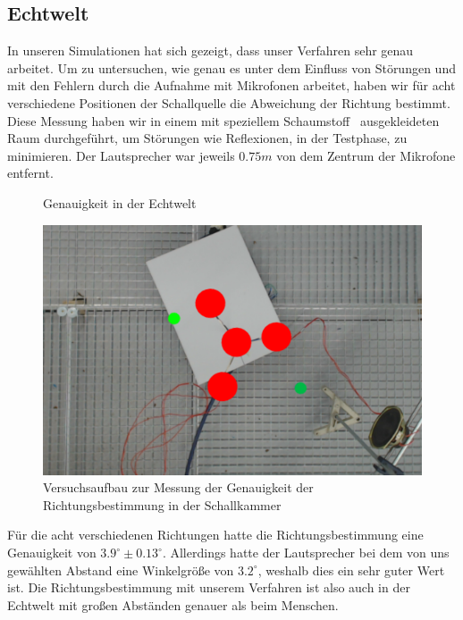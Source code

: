 \subsection{Echtwelt}
In unseren Simulationen hat sich gezeigt, dass unser Verfahren sehr genau arbeitet. Um zu untersuchen, wie genau es unter dem Einfluss von Störungen und mit den Fehlern durch die Aufnahme mit Mikrofonen arbeitet, haben wir für acht verschiedene Positionen der Schallquelle die Abweichung der Richtung bestimmt. Diese Messung haben wir in einem mit speziellem Schaumstoff~\cite{BASOTECT} ausgekleideten Raum durchgeführt, um Störungen wie Reflexionen, in der Testphase, zu minimieren. Der Lautsprecher war jeweils $0.75m$ von dem Zentrum der Mikrofone entfernt.
\begin{figure}[H]
  \centering
  \resizebox{!}{0.55\textwidth}{}
  \caption{Genauigkeit in der Echtwelt}
  \label{fig:real}
\end{figure}
\begin{figure}[H]
  \centering
  \includegraphics[width=.5\textwidth]{img/pos_1}
  \caption{Versuchsaufbau zur Messung der Genauigkeit der Richtungsbestimmung in der Schallkammer}
  \label{fig:real_reral}
\end{figure}
Für die acht verschiedenen Richtungen hatte die Richtungsbestimmung eine Genauigkeit von $3.9^\circ \pm 0.13^\circ$. Allerdings hatte der Lautsprecher bei dem von uns gewählten Abstand eine Winkelgröße von $3.2^\circ$, weshalb dies ein sehr guter Wert ist. Die Richtungsbestimmung mit unserem Verfahren ist also auch in der Echtwelt mit großen Abständen genauer als beim Menschen.

